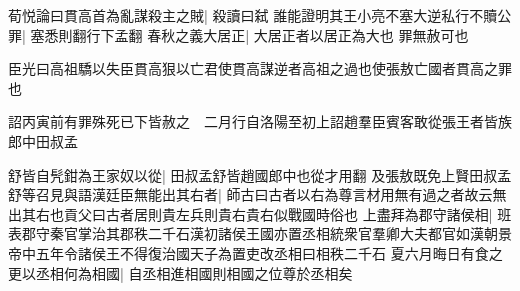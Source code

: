 荀悦論曰貫高首為亂謀殺主之賊|{
	殺讀曰弑}
誰能證明其王小亮不塞大逆私行不贖公罪|{
	塞悉則翻行下孟翻}
春秋之義大居正|{
	大居正者以居正為大也}
罪無赦可也

臣光曰高祖驕以失臣貫高狠以亡君使貫高謀逆者高祖之過也使張敖亡國者貫高之罪也

詔丙寅前有罪殊死已下皆赦之　二月行自洛陽至初上詔趙羣臣賓客敢從張王者皆族郎中田叔孟

舒皆自髠鉗為王家奴以從|{
	田叔孟舒皆趙國郎中也從才用翻}
及張敖既免上賢田叔孟舒等召見與語漢廷臣無能出其右者|{
	師古曰古者以右為尊言材用無有過之者故云無出其右也貢父曰古者居則貴左兵則貴右貴右似戰國時俗也}
上盡拜為郡守諸侯相|{
	班表郡守秦官掌治其郡秩二千石漢初諸侯王國亦置丞相統衆官羣卿大夫都官如漢朝景帝中五年令諸侯王不得復治國天子為置吏改丞相曰相秩二千石}
夏六月晦日有食之　更以丞相何為相國|{
	自丞相進相國則相國之位尊於丞相矣}



